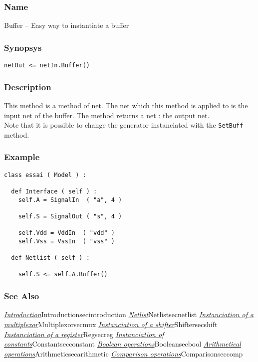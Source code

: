 \subsubsection{Name}

Buffer -- Easy way to instantiate a buffer

\subsubsection{Synopsys}

\begin{verbatim}
netOut <= netIn.Buffer()
\end{verbatim}
  
\subsubsection{Description}

This method is a method of net. The net which this method is applied to is the input net of the buffer. The method returns a net : the output net.\\
\indent Note that it is possible to change the generator instanciated with the \verb-SetBuff- method.

\subsubsection{Example}

\begin{verbatim}
class essai ( Model ) :

  def Interface ( self ) :
    self.A = SignalIn  ( "a", 4 )
    
    self.S = SignalOut ( "s", 4 )

    self.Vdd = VddIn  ( "vdd" )
    self.Vss = VssIn  ( "vss" )
	
  def Netlist ( self ) :

    self.S <= self.A.Buffer() 
\end{verbatim}

\begin{htmlonly}

\subsubsection{See Also}

\hyperref[ref]{\emph{Introduction}}{}{Introduction}{secintroduction}
\hyperref[ref]{\emph{Netlist}}{}{Netlist}{secnetlist}
\hyperref[ref]{\emph{Instanciation of a multiplexor}}{}{Multiplexor}{secmux}
\hyperref[ref]{\emph{Instanciation of a shifter}}{}{Shifter}{secshift}
\hyperref[ref]{\emph{Instanciation of a register}}{}{Reg}{secreg}
\hyperref[ref]{\emph{Instanciation of constants}}{}{Constant}{secconstant}
\hyperref[ref]{\emph{Boolean operations}}{}{Boolean}{secbool}
\hyperref[ref]{\emph{Arithmetical operations}}{}{Arithmetic}{secarithmetic}
\hyperref[ref]{\emph{Comparison operations}}{}{Comparison}{seccomp}

\end{htmlonly}
